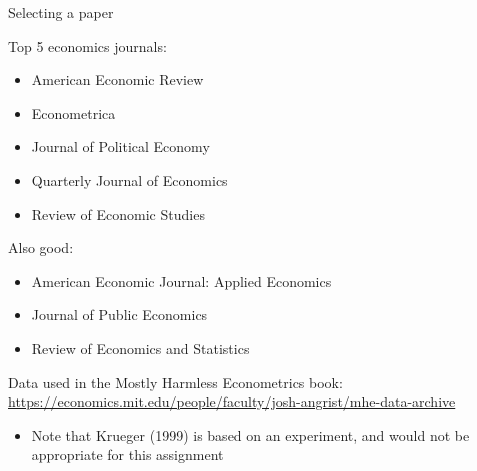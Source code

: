 \documentclass[handout, 8pt]{beamer}
\begin{document}
\begin{frame}{Selecting a paper}

Top 5 economics journals:
\begin{itemize}
    \item American Economic Review
    \item Econometrica
    \item Journal of Political Economy
    \item Quarterly Journal of Economics
    \item Review of Economic Studies
\end{itemize}
Also good:
\begin{itemize}
    \item American Economic Journal: Applied Economics
    \item Journal of Public Economics
    \item Review of Economics and Statistics
\end{itemize}


Data used in the Mostly Harmless Econometrics book: \url{https://economics.mit.edu/people/faculty/josh-angrist/mhe-data-archive}
\begin{itemize}
    \item Note that Krueger (1999) is based on an experiment, and would not be appropriate for this assignment
\end{itemize}

\end{frame}
\end{document}
